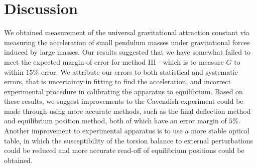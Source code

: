 \documentclass{article}
\begin{document}
\section{Discussion}

We obtained measurement of the universal gravitational attraction constant via measuring the acceleration of small pendulum masses under gravitational forces induced by large masses. Our results suggested that we have somewhat failed to meet the expected margin of error for method III - which is to measure $G$ to within $15\%$ error. We attribute our errors to both statistical and systematic errors, that is uncertainty in fitting to find the acceleration, and incorrect experimental procedure in calibrating the apparatus to equilibrium. Based on these results, we suggest improvements to the Cavendish experiment could be made through using more accurate methods, such as the final deflection method and equilibrium position method, both of which have an error margin of $5\%$. Another improvement to experimental apparatus is to use a more stable optical table, in which the susceptibility of the torsion balance to external perturbations could be reduced and more accurate read-off of equilibrium positions could be obtained. 
\end{document}
